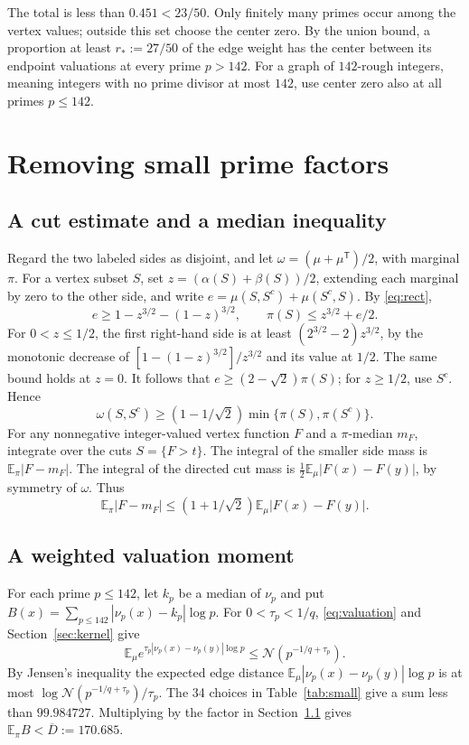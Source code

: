 \documentclass[11pt,a4paper]{article}
\begin{document}
The total is less than \(0.451<23/50\). Only finitely many primes
occur among the vertex values; outside this set choose the center
zero. By the union bound, a proportion at least \(r_*:=27/50\) of
the edge weight has the center between its endpoint valuations at
every prime \(p>142\). For a graph of \(142\)-rough integers, meaning
integers with no prime divisor at most \(142\), use center zero
also at all primes \(p\le142\).

\section{Removing small prime factors}\label{sec:small}

\subsection{A cut estimate and a median inequality}\label{sec:cut}

Regard the two labeled sides as disjoint, and let
\(\omega=(\mu+\mu^{\mathsf T})/2\), with marginal \(\pi\).
For a vertex subset \(S\), set \(z=(\alpha(S)+\beta(S))/2\), extending
each marginal by zero to the other side, and write
\(e=\mu(S,S^c)+\mu(S^c,S)\). By \eqref{eq:rect},
\[
 e\ge1-z^{3/2}-(1-z)^{3/2},\qquad \pi(S)\le z^{3/2}+e/2 .
\]
For \(0<z\le1/2\), the first right-hand side is at least
\((2^{3/2}-2)z^{3/2}\), by the monotonic decrease of
\([1-(1-z)^{3/2}]/z^{3/2}\) and its value at \(1/2\).
The same bound holds at \(z=0\). It follows that
\(e\ge(2-\sqrt2)\pi(S)\); for \(z\ge1/2\), use \(S^c\). Hence
\[
 \omega(S,S^c)\ge(1-1/\sqrt2)\min\{\pi(S),\pi(S^c)\}.
\]
For any nonnegative integer-valued vertex function \(F\) and a
\(\pi\)-median \(m_F\),
integrate over the cuts \(S=\{F>t\}\). The integral of the smaller
side mass is \(\mathbb E_\pi|F-m_F|\). The integral of the directed
cut mass is \(\tfrac12\mathbb E_\mu|F(x)-F(y)|\), by symmetry
of \(\omega\). Thus
\[
 \mathbb E_\pi|F-m_F|
 \le (1+1/\sqrt2)\mathbb E_\mu|F(x)-F(y)|.
\]

\subsection{A weighted valuation moment}

For each prime \(p\le142\), let \(k_p\) be a median of \(\nu_p\) and put
\(B(x)=\sum_{p\le142}|\nu_p(x)-k_p|\log p\).
For \(0<\tau_p<1/q\), \eqref{eq:valuation} and
Section~\ref{sec:kernel} give
\[
 \mathbb E_\mu e^{\tau_p|\nu_p(x)-\nu_p(y)|\log p}
 \le \mathcal N(p^{-1/q+\tau_p}).
\]
By Jensen's inequality the expected edge distance
\(\mathbb E_\mu|\nu_p(x)-\nu_p(y)|\log p\) is at most
\(\log\mathcal N(p^{-1/q+\tau_p})/\tau_p\).
The 34 choices in Table~\ref{tab:small} give a sum less than
\(99.984727\). Multiplying by the factor in
Section~\ref{sec:cut} gives \(\mathbb E_\pi B<\overline D:=170.685\).
\end{document}
